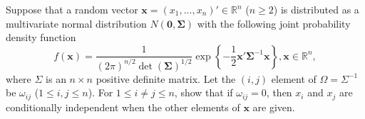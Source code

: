 \begin{exercise}\label{probability:2017:4}
Suppose that a random vector $\mathbf{x} = (x_1, ..., x_n)' \in \mathbb{R}^n$ ($n \geq 2$) is distributed as a multivariate normal distribution $N(\mathbf{0}, \boldsymbol{\Sigma})$ with the following joint probability density function
\[
f(\mathbf{x}) = \frac{1}{(2\pi)^{n/2}\det(\boldsymbol{\Sigma})^{1/2}} \exp\left\{-\frac{1}{2}\mathbf{x}'\boldsymbol{\Sigma}^{-1}\mathbf{x}\right\}, \mathbf{x} \in \mathbb{R}^n,
\]
where $\Sigma$ is an $n \times n$ positive definite matrix. Let the $(i,j)$ element of $\Omega = \Sigma^{-1}$ be $\omega_{ij}$ ($1 \leq i, j \leq n$). For $1 \leq i \neq j \leq n$, show that if $\omega_{ij} = 0$, then $x_i$ and $x_j$ are conditionally independent when the other elements of $\mathbf{x}$ are given.

%
\end{exercise}

